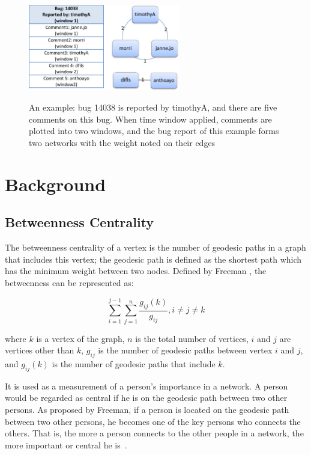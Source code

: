 \documentclass[conference]{IEEEtran}
\begin{document}
\begin{figure}[!t]
\centerline{\includegraphics[width=2.6in,height = 3.8cm]{graph.png}
\label{graph}}
\caption{An example: bug 14038 is reported by timothyA, and there are
  five comments on this bug. 
When time window applied, comments are plotted into two windows, and
the bug report of this example forms two networks with the weight
noted on their edges}

\end{figure}

\section{Background}
\label{background}
\subsection{Betweenness Centrality}

The betweenness centrality of
a vertex is the number of geodesic paths in a graph that includes this
vertex;
the geodesic path is defined as the shortest path which has the
minimum weight between two nodes. 
Defined by Freeman \cite{SOCIO:freeman}, the betweenness can be represented as:

\begin{equation} 
\sum_{i=1}^{j-1}\sum_{j=1}^{n}\frac{g_{ij}(k)}{g_{ij}}, i\neq j \neq k
\end{equation}

where $k$ is a vertex of the graph, $n$ is the total number of
vertices, $i$ and $j$ are vertices other than $k$, $g_{ij}$ is the
number of geodesic paths between vertex $i$ and $j$, and $g_{ij}(k)$
is the number of geodesic paths that include $k$.


It is used as a measurement of a person's importance in a network. 
A person would be regarded as central if he is on the geodesic path
between two other persons. 
As proposed by Freeman, if a person is located
on the geodesic path between two other persons, he becomes one of the key
persons who connects the others. 
That is, the more a person connects to
the other people in a network, the more important or central he is~\cite{BOOK:han}.
\end{document}
